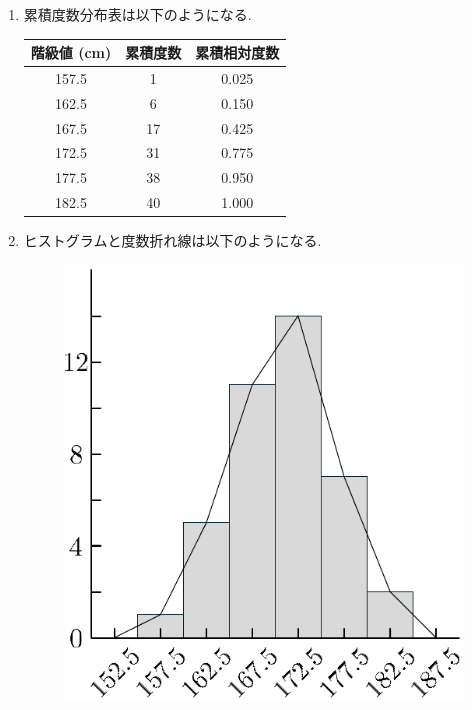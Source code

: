 \check
\begin{qenumerate}
	\item{
		\begin{enumerate}
			\item{
				累積度数分布表は以下のようになる.
				\begin{table}[H]
					\centering
					\begin{tabular}{c|c|c} \hline
						階級値 (cm) & 累積度数 & 累積相対度数 \\ \hline
						157.5 &  1 & 0.025 \\
						162.5 &  6 & 0.150 \\
						167.5 & 17 & 0.425 \\
						172.5 & 31 & 0.775 \\
						177.5 & 38 & 0.950 \\
						182.5 & 40 & 1.000 \\ \hline
					\end{tabular}
				\end{table}
			}
			\item{
				ヒストグラムと度数折れ線は以下のようになる.
				\begin{figure}[H]
					\centering
					\includegraphics[scale = 0.5]{./figure/81.pdf}

\end{figure}}
\end{enumerate}}
\end{qenumerate}
